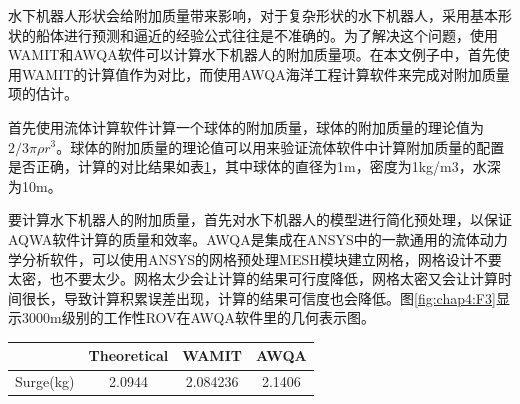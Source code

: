 水下机器人形状会给附加质量带来影响，对于复杂形状的水下机器人，采用基本形状的船体进行预测和逼近的经验公式往往是不准确的。为了解决这个问题，使用WAMIT和AWQA软件可以计算水下机器人的附加质量项。在本文例子中，首先使用WAMIT的计算值作为对比，而使用AWQA海洋工程计算软件来完成对附加质量项的估计。

首先使用流体计算软件计算一个球体的附加质量，球体的附加质量的理论值为$2/3\pi \rho r^3$。球体的附加质量的理论值可以用来验证流体软件中计算附加质量的配置是否正确，计算的对比结果如表\ref{tab:chap4:table3-1}，其中球体的直径为1m，密度为1kg/m3，水深为10m。

要计算水下机器人的附加质量，首先对水下机器人的模型进行简化预处理，以保证AQWA软件计算的质量和效率。AWQA是集成在ANSYS中的一款通用的流体动力学分析软件，可以使用ANSYS的网格预处理MESH模块建立网格，网格设计不要太密，也不要太少。网格太少会让计算的结果可行度降低，网格太密又会让计算时间很长，导致计算积累误差出现，计算的结果可信度也会降低。图\ref{fig:chap4:F3}显示3000m级别的工作性ROV在AWQA软件里的几何表示图。

\begin{table}
\centering
\label{tab:chap4:table3-1}
\begin{tabular}{cccc}
\toprule
           & Theoretical & WAMIT     & AWQA     \\
\midrule
 Surge(kg) & 2.0944      & 2.084236  &2.1406    \\
\bottomrule
\end{tabular}
\end{table}

